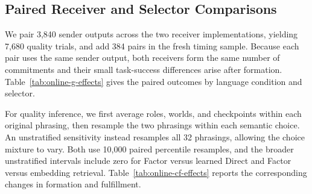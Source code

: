 \documentclass[sigconf,nonacm,balance=false]{aamas}
\begin{document}
\subsection{Paired Receiver and Selector Comparisons}

We pair 3,840 sender outputs across the two receiver implementations, yielding 7,680 quality trials, and add 384 pairs in the fresh timing sample. Because each pair uses the same sender output, both receivers form the same number of commitments and their small task-success differences arise after formation. Table~\ref{tab:online-g-effects} gives the paired outcomes by language condition and selector.

For quality inference, we first average roles, worlds, and checkpoints within each original phrasing, then resample the two phrasings within each semantic choice. An unstratified sensitivity instead resamples all 32 phrasings, allowing the choice mixture to vary. Both use 10,000 paired percentile resamples, and the broader unstratified intervals include zero for Factor versus learned Direct and Factor versus embedding retrieval. Table~\ref{tab:online-cf-effects} reports the corresponding changes in formation and fulfillment.
\end{document}
